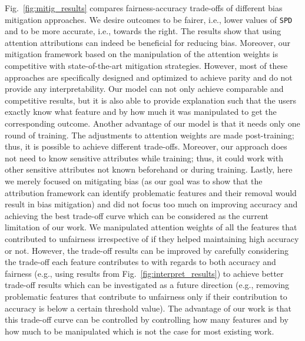 Fig.~\ref{fig:mitig_results} compares fairness-accuracy trade-offs of different bias mitigation approaches. We desire outcomes to be fairer, i.e., lower values of \texttt{SPD} and to be more accurate, i.e., towards the right. The results show that using attention attributions can indeed be beneficial for reducing bias. Moreover, our mitigation framework based on the manipulation of the attention weights is competitive with state-of-the-art mitigation strategies. However, most of these approaches are  specifically designed and optimized to achieve parity and do not provide any interpretability. 
Our model can not only achieve comparable and competitive results, but it is also able to provide explanation such that the users exactly know what feature and by how much it was manipulated to get the corresponding outcome. Another advantage of our model is that it needs only one round of training. The adjustments to attention weights are made post-training; thus, it is possible to achieve different trade-offs. Moreover, our approach does not need to know sensitive attributes while training; thus, it could work with other sensitive attributes not known beforehand or during training.  Lastly, here we merely focused on mitigating bias (as our goal was to show that the attribution framework can identify problematic features and their removal would result in bias mitigation) and did not focus too much on improving accuracy and achieving the best trade-off curve which can be considered as the current limitation of our work. We manipulated attention weights of all the features that contributed to unfairness irrespective of if they helped maintaining high accuracy or not. However, the trade-off results can be improved by carefully considering the trade-off each feature contributes to with regards to both accuracy and fairness (e.g., using results from Fig.~\ref{fig:interpret_results}) to achieve better trade-off results which can be investigated as a future direction (e.g., removing problematic features that contribute to unfairness only if their contribution to accuracy is below a certain threshold value). The advantage of our work is that this trade-off curve can be controlled by controlling how many features and by how much to be manipulated which is not the case for most existing work.







